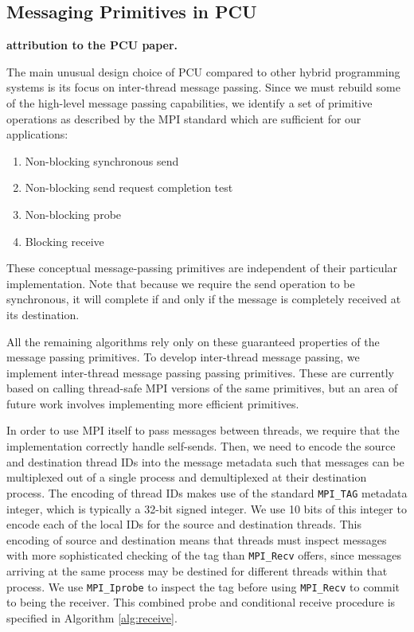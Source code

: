 \subsection{Messaging Primitives in PCU}
\label{sec:pcu_p2p}

{\bf attribution to the PCU paper.}

The main unusual design choice of PCU compared to
other hybrid programming systems is
its focus on inter-thread message passing.
Since we must rebuild some of the high-level message
passing capabilities, we identify a set of primitive
operations as described by the MPI standard \cite{walker1996mpi}
which are sufficient for our applications:

\begin{enumerate}
\item Non-blocking synchronous send
\item Non-blocking send request completion test
\item Non-blocking probe
\item Blocking receive
\end{enumerate}

These conceptual message-passing primitives are independent
of their particular implementation.
Note that because we require the send operation to be synchronous,
it will complete if and only if the message is completely received at its
destination.

All the remaining algorithms rely only on these guaranteed properties
of the message passing primitives.
To develop inter-thread message passing, we implement inter-thread
message passing passing primitives.
These are currently based on calling thread-safe MPI versions of the
same primitives, but an area of future work involves implementing
more efficient primitives.

In order to use MPI itself to pass messages between threads, we require
that the implementation correctly handle self-sends.
Then, we need to encode the source and destination thread IDs into the message
metadata such that messages can be multiplexed out of a single process
and demultiplexed at their destination process.
The encoding of thread IDs makes use of the standard \texttt{MPI\_TAG} metadata
integer, which is typically a 32-bit signed integer.
We use 10 bits of this integer to encode each of the local IDs for the
source and destination threads.
This encoding of source and destination means that threads must inspect
messages with more sophisticated checking of the tag than
\texttt{MPI\_Recv}
offers, since messages arriving at the same process may be destined
for different threads within that process.
We use \texttt{MPI\_Iprobe} to inspect the tag before using
\texttt{MPI\_Recv} to commit to being the receiver.
This combined probe and conditional receive procedure is specified
in Algorithm \ref{alg:receive}.

